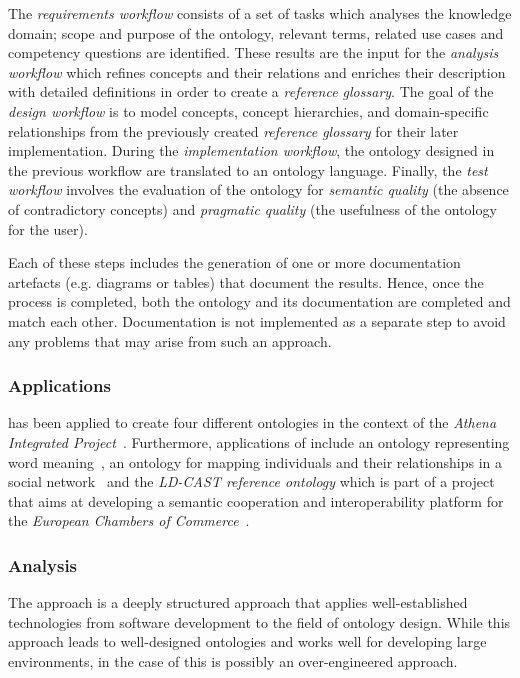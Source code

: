 The \emph{requirements workflow} consists of a set of tasks which analyses the knowledge domain; scope and purpose of the ontology, relevant terms, related use cases and competency questions are identified. These results are the input for the \emph{analysis workflow} which refines concepts and their relations and enriches their description with detailed definitions in order to create a \emph{reference glossary}. The goal of the \emph{design workflow} is to model concepts, concept hierarchies, and domain-specific relationships from the previously created \emph{reference glossary} for their later implementation.
During the \emph{implementation workflow}, the ontology designed in the previous workflow are translated to an ontology language. Finally, the \emph{test workflow} involves the evaluation of the ontology for \emph{semantic quality} (the absence of contradictory concepts) and \emph{pragmatic quality} (the usefulness of the ontology for the user).

Each of these steps includes the generation of one or more documentation artefacts (e.g. diagrams or tables) that document the results. Hence, once the  process is completed, both the ontology and its documentation are completed and match each other. Documentation is not implemented as a separate step to avoid any problems that may arise from such an approach.

\subsubsection{Applications}

 has been applied to create four different ontologies in the context of the \emph{Athena Integrated Project}~\cite{AthenaProject}. Furthermore, applications of  include an ontology representing word meaning~\cite{upon_example1}, an ontology for mapping individuals and their relationships in a social network~\cite{upon_example2} and the \emph{LD-CAST reference ontology} which is part of a project that aims at developing a semantic cooperation and interoperability platform for the \emph{European Chambers of Commerce}~\cite{upon_example3,ld_cast}.

\subsubsection{Analysis}

The  approach is a deeply structured approach that applies well-established technologies from software development to the field of ontology design. While this approach leads to well-designed ontologies and works well for developing large environments, in the case of \smarthomeweather this is possibly an over-engineered approach.

